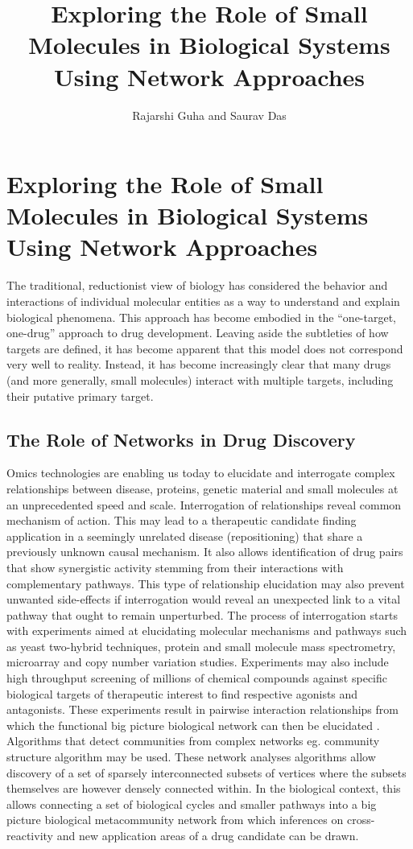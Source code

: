 \documentclass[]{book}
\title{Exploring the Role of Small Molecules in Biological Systems Using Network Approaches}
\author{Rajarshi Guha and Saurav Das}
\begin{document}
\frontmatter
\mainmatter

\chapter{Exploring the Role of Small Molecules in Biological Systems Using Network Approaches}

The traditional, reductionist view of biology has considered the
behavior and interactions of individual molecular entities as a way to
understand and explain biological phenomena. This approach has become
embodied in the ``one-target, one-drug''  approach to drug
development. Leaving aside the subtleties of how targets are defined,
it has become apparent that this model does not correspond very well
to reality. Instead, it has become increasingly clear that many drugs
(and more generally, small molecules) interact with multiple targets,
including their putative primary target. 

\section{The Role of Networks in Drug Discovery}  
\label{sec:role-networks-drug}
Omics technologies are enabling us today to elucidate and interrogate complex relationships between disease, proteins, genetic material and small molecules at an unprecedented speed and scale. Interrogation of relationships reveal common mechanism of action. This may lead to a therapeutic candidate finding application in a seemingly unrelated disease (repositioning) that share a previously unknown causal mechanism. It also allows identification of drug pairs that show synergistic activity stemming from their interactions with complementary pathways. This type of relationship elucidation may also prevent unwanted side-effects if interrogation would reveal an unexpected link to a vital pathway that ought to remain unperturbed. The process of interrogation starts with experiments aimed at elucidating molecular mechanisms and pathways such as yeast two-hybrid techniques, protein and small molecule mass spectrometry, microarray and copy number variation studies. Experiments may also include high throughput screening of millions of chemical compounds against specific biological targets of therapeutic interest to find respective agonists and antagonists. These experiments result in pairwise interaction relationships from which the functional big picture biological network can then be elucidated \cite{Wu2010}. Algorithms that detect communities from complex networks eg. community structure algorithm \cite{girvan2002community} may be used. These network analyses algorithms allow discovery of a set of sparsely interconnected subsets of vertices where the subsets themselves are however densely connected within. In the biological context, this allows connecting a set of biological cycles and smaller pathways into a big picture biological metacommunity network from which inferences on cross-reactivity and new application areas of a drug candidate can be drawn.
\end{document}
